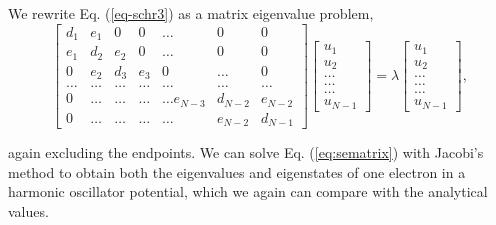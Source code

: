 \documentclass[a4paper]{article}
\begin{document}
We rewrite Eq. (\ref{eq-schr3}) as a matrix eigenvalue problem,
\begin{equation}
    \begin{bmatrix}d_1 & e_1 & 0   & 0    & \dots  &0     & 0 \\
                                e_1 & d_2 & e_2 & 0    & \dots  &0     &0 \\
                                0   & e_2 & d_3 & e_3  &0       &\dots & 0\\
                                \dots  & \dots & \dots & \dots  &\dots      &\dots & \dots\\
                                0   & \dots & \dots & \dots  &\dots  e_{N-3}     &d_{N-2} & e_{N-2}\\
                                0   & \dots & \dots & \dots  &\dots       &e_{N-2} & d_{N-1}
             \end{bmatrix}  \begin{bmatrix} u_{1} \\
                                                              u_{2} \\
                                                              \dots\\ \dots\\ \dots\\
                                                              u_{N-1}
             \end{bmatrix}=\lambda \begin{bmatrix} u_{1} \\
                                                              u_{2} \\
                                                              \dots\\ \dots\\ \dots\\
                                                              u_{N-1}
             \end{bmatrix},  
      \label{eq:sematrix}
\end{equation}

again excluding the endpoints. We can solve Eq. (\ref{eq:sematrix}) with Jacobi's method to obtain both the eigenvalues and eigenstates of one electron in a harmonic oscillator potential, which we again can compare with the analytical values.


\end{document}
